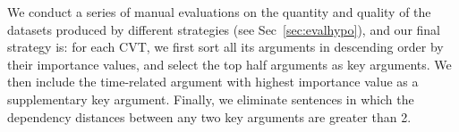 We conduct a series of manual evaluations on the quantity and quality of the datasets produced by different strategies (see Sec~\ref{sec:evalhypo}), and 
our final strategy is: 
for each CVT, we first sort all its arguments in descending order by their importance values, and select the top half arguments as key arguments. 
We then include the time-related argument with highest importance value as a supplementary key argument. 
Finally, we eliminate sentences in which the dependency distances between any two key arguments are greater than 2.


%
